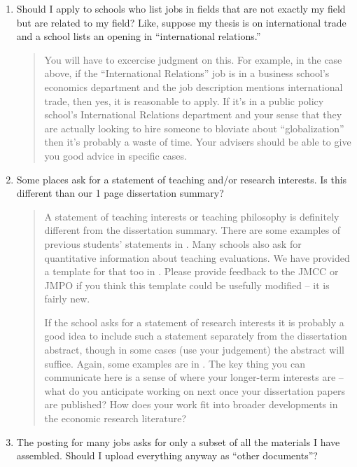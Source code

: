 \documentclass{\classes/econtex}
\providecommand\phantomsection{}
\begin{document}
\begin{enumerate}
\begin{quote}
  \end{quote}
\item  Should I apply to schools who list jobs in fields that are not exactly my field but are related to my
  field?  Like, suppose my thesis is on international trade and a school lists
  an opening in ``international relations.''

  \begin{quote}
    You will have to excercise judgment on this.  For example, in the case
    above, if the ``International Relations'' job is in a business
    school's economics department and the job description mentions
    international trade, then yes, it is reasonable to apply.  If it's in
    a public policy school's International Relations department and your
    sense that they are actually looking to hire someone to bloviate about
    ``globalization'' then it's probably a waste of time.  Your advisers
    should be able to give you good advice in specific cases.

  \end{quote}
\item  Some places ask for a statement of teaching and/or research
  interests.  Is this different than our 1 page
  dissertation summary?

  \begin{quote}
    A statement of teaching interests or teaching philosophy is
    definitely different from the dissertation summary.  There are some
    examples of previous students' statements in \Resources.  Many
    schools also ask for quantitative information about teaching
    evaluations.  We have provided a template for that too in
    \Templates.  Please provide feedback to the JMCC or JMPO if you
    think this template could be usefully modified -- it is fairly new.

    If the school asks for a statement of research interests it is probably
    a good idea to include such a statement separately from the dissertation
    abstract, though in some cases (use your judgement) the abstract will suffice.  Again, some examples are in \Resources.  
    The key thing you can communicate here is a sense of where your longer-term 
    interests are -- what do you anticipate working on next once your dissertation
    papers are published?  How does your work fit into broader developments in 
    the economic research literature?

    \ifdvi\phantomsection\hypertarget{PostOtherDocsQ}{}\fi
  \end{quote}
\item  The {\JOE} posting for many jobs asks for only a subset of all the materials I have assembled.  Should I upload everything anyway as ``other documents''?


\end{enumerate}
\end{document}
